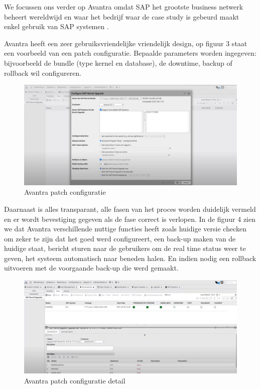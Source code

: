 \documentclass[dutch,dit,thesis]{hogentreport}
\begin{document}
  We focussen ons verder op Avantra omdat SAP het grootste business netwerk beheert wereldwijd en waar het bedrijf waar de case study is gebeurd maakt enkel gebruik van SAP systemen \autocite{Laborde2024}.
 
Avantra heeft een zeer gebruiksvriendelijke vriendelijk design, op figuur 3 staat een voorbeeld van een patch configuratie. Bepaalde parameters worden ingegeven: bijvoorbeeld de bundle (type kernel en database), de downtime, backup of 
 rollback wil configureren. \\ 



\begin{figure}[htbp]
    \centering
    \includegraphics[width=\textwidth]{avantra1.png}
    \caption{Avantra patch configuratie }
     \label{fig:avantra1}
\end{figure}



Daarnaast is alles transparant, alle fasen van het proces worden duidelijk vermeld en er wordt bevestiging gegeven als de fase correct is verlopen. In de figuur 4 zien we dat Avantra verschillende
nuttige functies heeft zoals huidige versie checken om zeker te zijn dat het goed werd configureert, een back-up maken van de huidige staat, bericht sturen naar de gebruikers om de real time status weer
   te geven, het systeem automatisch naar beneden halen. En indien nodig een rollback uitvoeren met de voorgaande back-up die werd gemaakt.

\begin{figure}[htbp]
    \centering
    \includegraphics[width=\textwidth]{avantra2.png}
    \caption{Avantra patch configuratie detail}
     \label{fig:avantra2}
\end{figure}
\end{document}
